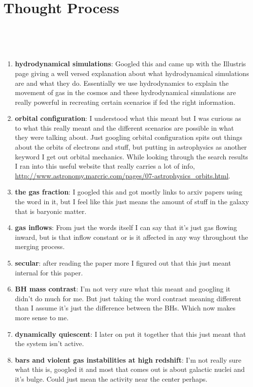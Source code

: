 \documentclass{article}
\begin{document}
\section{Thought Process}
\
\
\par
\begin{enumerate}
	\item \textbf{hydrodynamical simulations}:	Googled this and came up with the Illustris page giving a well versed explanation about what hydrodynamical simulations are and what they do. Essentially we use hydrodynamics to explain the movement of gas in the cosmos and these hydrodynamical simulations are really powerful in recreating certain scenarios if fed the right information.
	\item \textbf{orbital configuration}: I understood what this meant but I was curious as to what this really meant and the different scenarios are possible in what they were talking about. Just googling orbital configuration spits out things about the orbits of electrons and stuff, but putting in astrophysics as another keyword I get out orbital mechanics. While looking through the search results I ran into this useful website that really carries a lot of info, \url{http://www.astronomy.marcric.com/pages/07-astrophysics_orbits.html}.
	\item \textbf{the gas fraction}: I googled this and got mostly links to arxiv papers using the word in it, but I feel like this just means the amount of stuff in the galaxy that is baryonic matter.
	\item \textbf{gas inflows}: From just the words itself I can say that it's just gas flowing inward, but is that inflow constant or is it affected in any way throughout the merging process.
	\item \textbf{secular}: after reading the paper more I figured out that this just meant internal for this paper.
	\item \textbf{BH mass contrast}: I'm not very sure what this meant and googling it didn't do much for me. But just taking the word contrast meaning different than I assume it's just the difference between the BHs. Which now makes more sense to me.
	\item \textbf{dynamically quiescent}: I later on put it together that this just meant that the system isn't active.
	\item \textbf{bars and violent gas instabilities at high redshift}: I'm not really sure what this is, googled it and most that comes out is about galactic nuclei and it's bulge. Could just mean the activity near the center perhaps.

\end{enumerate}
\end{document}
